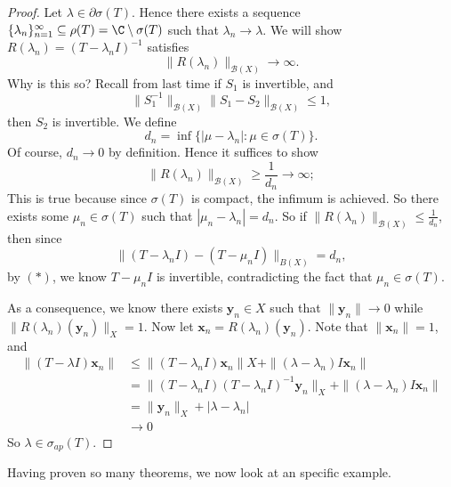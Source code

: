 \documentclass[a4paper]{article}
\begin{document}
\begin{proof}
  Let $\lambda \in \partial \sigma(T)$. Hence there exists a sequence $\{\lambda_n\}_{n = 1}^\infty \subseteq \rho(T) = \C\setminus \sigma(T)$ such that $\lambda_n \to \lambda$. We will show $R(\lambda_n) = (T - \lambda_n I)^{-1}$ satisfies
  \[
    \|R(\lambda_n)\|_{\mathcal{B}(X)} \to \infty.
  \]
  Why is this so? Recall from last time if $S_1$ is invertible, and
  \[
    \|S_1^{-1}\|_{\mathcal{B}(X)} \|S_1 - S_2\|_{\mathcal{B}(X)} \leq 1, \tag{$*$}
  \]
  then $S_2$ is invertible. We define
  \[
    d_n = \inf\{ |\mu - \lambda_n|: \mu \in \sigma(T)\}.
  \]
  Of course, $d_n \to 0$ by definition. Hence it suffices to show
  \[
    \|R(\lambda_n)\|_{\mathcal{B}(X)} \geq \frac{1}{d_n} \to \infty;
  \]
  This is true because since $\sigma(T)$ is compact, the infimum is achieved. So there exists some $\mu_n \in \sigma(T)$ such that $|\mu_n - \lambda_n| = d_n$. So if $\|R(\lambda_n)\|_{\mathcal{B}(X)} \leq \frac{1}{d_n}$, then since
  \[
    \|(T - \lambda_n I) - (T - \mu_n I)\|_{B(X)} = d_n,
  \]
  by $(*)$, we know $T - \mu_n I$ is invertible, contradicting the fact that $\mu_n \in \sigma(T)$.

  As a consequence, we know there exists $\mathbf{y}_n \in X$ such that $\|\mathbf{y}_n\| \to 0$ while $\|R(\lambda_n)(\mathbf{y}_n)\|_X = 1$. Now let $\mathbf{x}_n = R(\lambda_n) (\mathbf{y}_n)$. Note that $\|\mathbf{x}_n\| = 1$, and
  \begin{align*}
    \|(T - \lambda I)\mathbf{x}_n \| &\leq \|(T - \lambda_n I) \mathbf{x}_n\|X + \|(\lambda - \lambda_n) I \mathbf{x}_n\|\\
    &= \|(T - \lambda_n I) (T - \lambda_n I)^{-1} \mathbf{y}_n\|_X + \|(\lambda - \lambda_n) I \mathbf{x}_n\|\\
    &= \|\mathbf{y}_n\|_X + |\lambda - \lambda_n|\\
    &\to 0
  \end{align*}
  So $\lambda \in \sigma_{ap}(T)$.
\end{proof}

Having proven so many theorems, we now look at an specific example.
\end{document}
